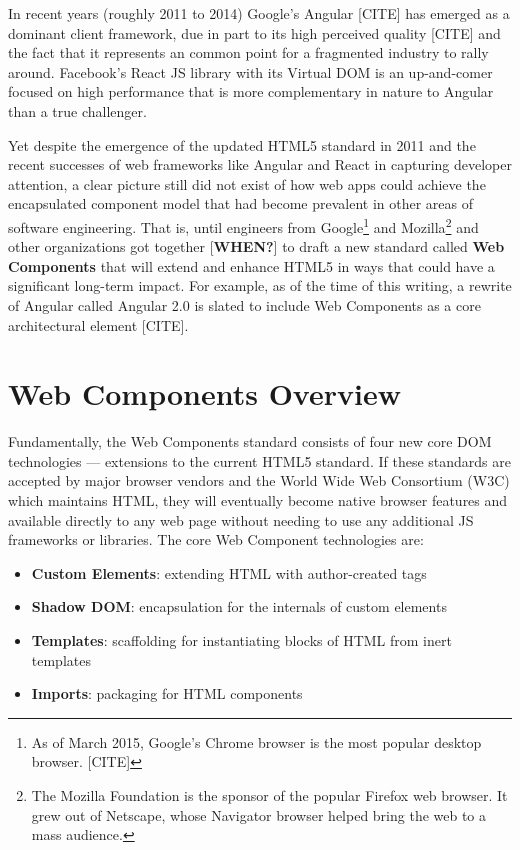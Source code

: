 In recent years (roughly 2011 to 2014) Google's Angular [CITE] 
has emerged as a dominant client framework, 
due in part to its high perceived quality [CITE] and the fact that it represents an common point for a fragmented industry to rally around.
Facebook's React 
JS library with its Virtual DOM is an up-and-comer focused on high performance that is more complementary in nature to Angular than a true challenger.

Yet despite the emergence of the updated HTML5 standard in 2011 and the recent successes of web frameworks like Angular and React in capturing developer attention, 
a clear picture still did not exist of how web apps could achieve the encapsulated component model that had become prevalent in other areas of software engineering.
That is, until engineers from Google\footnote{
As of March 2015, Google's Chrome browser is the most popular desktop browser. [CITE]}
and Mozilla\footnote{
The Mozilla Foundation is the sponsor of the popular Firefox web browser. It grew out of Netscape, whose Navigator browser helped bring the web to a mass audience.}
and other organizations got together [\textbf{WHEN?}] to draft a new standard called \textbf{Web Components} that will extend and enhance HTML5 in ways that could have a significant long-term impact. 
For example, as of the time of this writing, a rewrite of Angular called Angular 2.0 is slated to include Web Components as a core architectural element [CITE].

\section{Web Components Overview}
Fundamentally, the Web Components standard consists of four new core DOM technologies --- extensions to the current HTML5 standard.
If these standards are accepted by major browser vendors and the World Wide Web Consortium (W3C)
which maintains HTML, 
they will eventually become native browser features and available directly to any web page without needing to use any additional JS frameworks or libraries. 
The core Web Component technologies are:
\begin{itemize}
\item
\textbf{Custom Elements}: extending HTML with author-created tags
\item
\textbf{Shadow DOM}: encapsulation for the internals of custom elements
\item
\textbf{Templates}: scaffolding for instantiating blocks of HTML from inert templates
\item
\textbf{Imports}: packaging for HTML components
\end{itemize}

